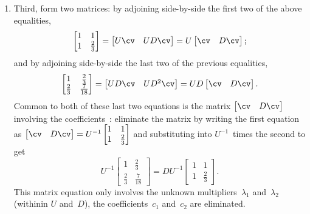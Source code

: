 \begin{draft}
\begin{example}
\begin{solution}
\begin{enumerate}
\item \label{eg:2expfitc}
Third, form two matrices: by adjoining side-by-side the first two of the above equalities,
\begin{equation*}
\begin{bmatrix} 1&1\\1&\tfrac23 \end{bmatrix}
=\begin{bmatrix} U\cv& UD\cv \end{bmatrix}
=U\begin{bmatrix} \cv&D\cv \end{bmatrix};
\end{equation*}
and by adjoining side-by-side the last two of the previous equalities, 
\begin{equation*}
\begin{bmatrix} 1&\tfrac23\\\tfrac23&\frac7{18} \end{bmatrix}
=\begin{bmatrix} UD\cv&UD^2\cv \end{bmatrix}
=UD\begin{bmatrix} \cv&D\cv \end{bmatrix}.
\end{equation*}
Common to both of these last two equations is the matrix \(\begin{bmatrix} \cv&D\cv \end{bmatrix}\) involving the coefficients~\cv: eliminate the matrix by writing the first equation as \(\begin{bmatrix} \cv&D\cv \end{bmatrix}=U^{-1}\begin{bmatrix} 1&1\\1&\tfrac23 \end{bmatrix}\) and substituting into \(U^{-1}\)~times the second to get 
\begin{equation*}
U^{-1}\begin{bmatrix} 1&\tfrac23\\\tfrac23&\frac7{18} \end{bmatrix}
=DU^{-1}\begin{bmatrix} 1&1\\1&\tfrac23 \end{bmatrix}.
\end{equation*}
This matrix equation only involves the unknown multipliers~\(\lambda_1\) and~\(\lambda_2\)  (withinin \(U\) and~\(D\)), the coefficients~\(c_1\) and~\(c_2\) are eliminated.


\end{enumerate}
\end{solution}
\end{example}
\end{draft}
